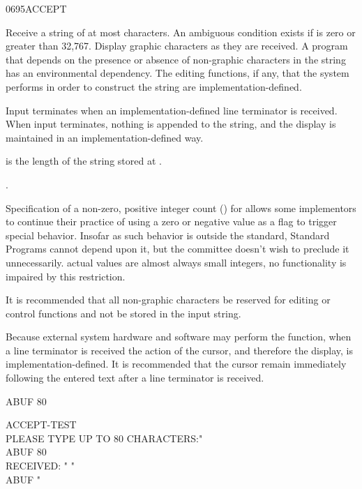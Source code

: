 \begin{worddef}{0695}{ACCEPT}
\item {}

	Receive a string of at most  characters. An ambiguous
	condition exists if  is zero or greater than 32,767.
	Display graphic characters as they are received. A program that
	depends on the presence or absence of non-graphic characters in the
	string has an environmental dependency. The editing functions, if
	any, that the system performs in order to construct the string are
	implementation-defined.

	Input terminates when an implementation-defined line terminator is
	received. When input terminates, nothing is appended to the string,
	and the display is maintained in an implementation-defined way.

	 is the length of the string stored at .

\see {}.

	\begin{rationale} %
		Specification of a non-zero, positive integer count ()
		for  allows some implementors to continue their
		practice of using a zero or negative value as a flag to trigger
		special behavior. Insofar as such behavior is outside the
		standard, Standard Programs cannot depend upon it, but the
		committee doesn't wish to preclude it unnecessarily.
		 actual values are almost always small integers, no
		functionality is impaired by this restriction.

		It is recommended that all non-graphic characters be reserved
		for editing or control functions and not be stored in the input
		string.

		Because external system hardware and software may perform the
		 function, when a line terminator is received the
		action of the cursor, and therefore the display, is
		implementation-defined. It is recommended that the cursor remain
		immediately following the entered text after a line terminator
		is received.
	\end{rationale}

	\begin{testing} %
		\ttfamily
		 ABUF 80  

		\word{:} ACCEPT-TEST \\
		\tab[2]   PLEASE TYPE UP TO 80 CHARACTERS:"  \\
		\tab[2] ABUF 80  \\
		\tab[2]   RECEIVED: " \word{[CHAR]} "  \\
		\tab[2] ABUF   \word{[CHAR]} "   \\
		\word{;}

	\end{testing}
\end{worddef}



